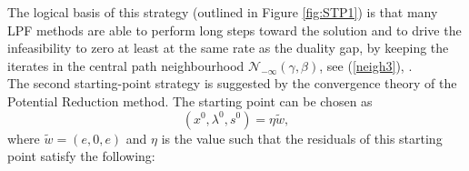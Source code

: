 \documentclass[a4paper,10 pt,titlepage,twoside]{book}
\theoremstyle{plain}
\theoremstyle{definition}
\theoremstyle{remark}
\begin{document}
The logical basis of this strategy (outlined in Figure \ref{fig:STP1}) is that many LPF methods are able to perform long steps toward the solution and to drive the infeasibility to zero at least at the same rate as the duality gap, by keeping the iterates in the central path neighbourhood $\mathcal{N}_{-\infty}(\gamma,\beta)$, see (\ref{neigh3}),  \cite{SPS}.\\[1 cm]
The second starting-point strategy is suggested by the convergence theory of the Potential Reduction method. The starting point can be chosen as \begin{equation*}
(x^{0}, \lambda^{0}, s^{0}) = \eta \tilde{w},
\end{equation*}where $\tilde{w} = (e,0,e)$ and $\eta$ is the value such that the residuals of this starting point satisfy the following:
\end{document}
